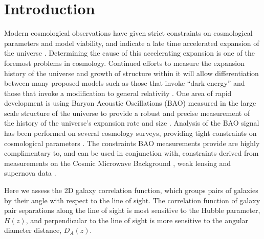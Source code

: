 \documentclass[iop,twocolappendix]{emulateapj}
\begin{document}



\section{Introduction}


Modern cosmological observations have given strict constraints on cosmological parameters and model viability, and indicate a late time accelerated expansion of the universe \citep{RiessFilippenko1998, PerlmutterAldering1999, SpergelVerde2003, RiessStrolger2004, TegmarkBlanton2004, SanchezBaugh2006, SpergelBean2007, Komatsu2009, RiessMacri2009, PercivalReid2010, ReidPercival2010,BlakeKazin2011}. Determining the cause of this accelerating expansion is one of the foremost problems in cosmology.   Continued efforts to measure the expansion history of the universe and growth of structure within it will allow differentiation between many proposed models such as those that invoke ``dark energy'' and those that invoke a modification to general relativity \citep{AlbrechtBernstein2006, SanchezScoccola2012}. One area of rapid development is using Baryon Acoustic Oscillations (BAO) measured in the large scale structure of the universe to provide a robust and precise measurement of the history of the universe's expansion rate and size \citep{EisensteinHu1998,BlakeGlazebrook2003,HuHaiman2003,Linder2003,SeoEisenstein2003}. Analysis of the BAO signal has been performed on several cosmology surveys, providing tight constraints on cosmological parameters \citep{Eisenstein2005,PercivalCole2007,Gaztanaga2009,PercivalReid2010,BlakeDavis2011,BlakeKazin2011, SanchezKazinBeutler2013, AndersonAubourg2014}. The constraints BAO measurements provide are highly complimentary to, and can be used in conjunction with, constraints derived from measurements on the Cosmic Microwave Background  \citep[CMB;][]{BennettHalpern2003, Planck201416}, weak lensing \citep{VanWaerbeke2000,WittmanTyson2000,KaiserWilson2000} and supernova data \citep{KowalskiRubin2008, KesslerBeckerCinabro2009, BetouleKessler2014}.

Here we assess the 2D galaxy correlation function, which groups pairs of galaxies by their angle with respect to the line of sight.  The correlation function of galaxy pair separations along the line of sight is most sensitive to the Hubble parameter, $H(z)$, and  perpendicular to the line of sight is more sensitive to the angular diameter distance, $D_A(z)$.  
\end{document}
